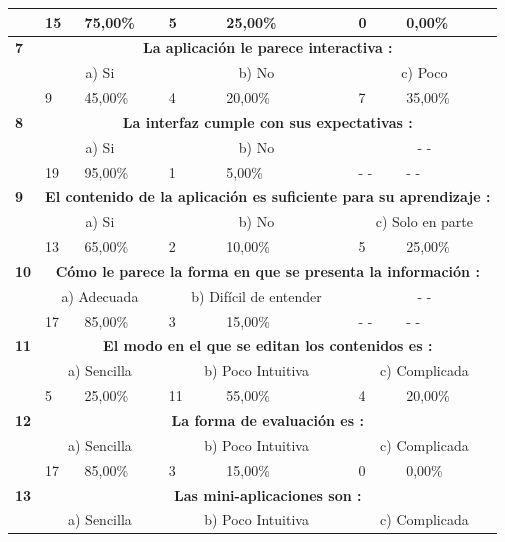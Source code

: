 \documentclass[letterpaper, 11pt, oneside]{article}
\theoremstyle{definition}
\theoremstyle{remark}
\begin{document}
\begin{table}[htbp]
\begin{center}
\begin{tabular}{|p{1.6cm}|p{1.8cm}|p{1.8cm}|p{1.8cm}|p{1.8cm}|p{1.8cm}|p{1.8cm}|}
 & 15 & 75,00\% & 5 & 25,00\% & 0 & 0,00\% \\ \hline
\textbf{7} & \multicolumn{ 6}{c|}{\textbf{ La aplicación le parece interactiva :}} \\ \hline
 & \multicolumn{ 2}{c|}{a) Si} & \multicolumn{ 2}{c|}{b) No} & \multicolumn{ 2}{c|}{c) Poco} \\ \hline
 & 9 & 45,00\% & 4 & 20,00\% & 7 & 35,00\% \\ \hline
\textbf{8} & \multicolumn{ 6}{c|}{\textbf{La interfaz cumple con sus expectativas :}} \\ \hline
 & \multicolumn{ 2}{c|}{a) Si} & \multicolumn{ 2}{c|}{b) No} & \multicolumn{ 2}{c|}{- -} \\ \hline
 & 19 & 95,00\% & 1 & 5,00\% & - - & - - \\ \hline
\textbf{9} & \multicolumn{ 6}{c|}{\textbf{El contenido de la aplicación es suficiente para su aprendizaje :}} \\ \hline
 & \multicolumn{ 2}{c|}{a) Si} & \multicolumn{ 2}{c|}{b) No} & \multicolumn{ 2}{c|}{c) Solo en parte} \\ \hline
 & 13 & 65,00\% & 2 & 10,00\% & 5 & 25,00\% \\ \hline
\textbf{10} & \multicolumn{ 6}{c|}{\textbf{Cómo le parece la forma en que se presenta la información :}} \\ \hline
 & \multicolumn{ 2}{c|}{a) Adecuada} & \multicolumn{ 2}{c|}{b) Difícil de entender} & \multicolumn{ 2}{c|}{- -} \\ \hline
 & 17 & 85,00\% & 3 & 15,00\% & - - & - - \\ \hline
\textbf{11} & \multicolumn{ 6}{c|}{\textbf{El modo en el que se editan los contenidos es :}} \\ \hline
 & \multicolumn{ 2}{c|}{a) Sencilla} & \multicolumn{ 2}{c|}{b) Poco Intuitiva} & \multicolumn{ 2}{c|}{c) Complicada} \\ \hline
 & 5 & 25,00\% & 11 & 55,00\% & 4 & 20,00\% \\ \hline
\textbf{12} & \multicolumn{ 6}{c|}{\textbf{La forma de evaluación es :}} \\ \hline
 & \multicolumn{ 2}{c|}{a) Sencilla} & \multicolumn{ 2}{c|}{b) Poco Intuitiva} & \multicolumn{ 2}{c|}{c) Complicada} \\ \hline
 & 17 & 85,00\% & 3 & 15,00\% & 0 & 0,00\% \\ \hline
\textbf{13} & \multicolumn{ 6}{c|}{\textbf{ Las mini-aplicaciones son :}} \\ \hline
 & \multicolumn{ 2}{c|}{a) Sencilla} & \multicolumn{ 2}{c|}{b) Poco Intuitiva} & \multicolumn{ 2}{c|}{c) Complicada} \\ \hline

\end{tabular}
\end{center}
\end{table}
\end{document}

